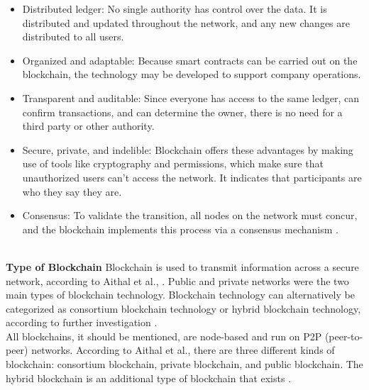 \begin{itemize}
    \item Distributed ledger: No single authority has control over the data. It is distributed and updated throughout the network, and any new changes are distributed to all users.
    \item Organized and adaptable: Because smart contracts can be carried out on the blockchain, the technology may be developed to support company operations.
   \item Transparent and auditable: Since everyone has access to the same ledger, can confirm transactions, and can determine the owner, there is no need for a third party or other authority. 
    \item Secure, private, and indelible:
    Blockchain offers these advantages by making use of tools like cryptography and permissions, which make sure that unauthorized users can't access the network. It indicates that participants are who they say they are.
    \item Consensus: To validate the transition, all nodes on the network must concur, and the blockchain implements this process via a consensus mechanism \cite{Gupta}.
\end{itemize}
\\
\textbf{Type of Blockchain}
Blockchain is used to transmit information across a secure network, according to Aithal et al., \cite{Aithal}. Public and private networks were the two main types of blockchain technology. Blockchain technology can alternatively be categorized as consortium blockchain technology or hybrid blockchain technology, according to further investigation \cite{Aithal}. \\
All blockchains, it should be mentioned, are node-based and run on P2P (peer-to-peer) networks. According to Aithal et al., \cite{Aithal}there are three different kinds of blockchain: consortium blockchain, private blockchain, and public blockchain. The hybrid blockchain is an additional type of blockchain that exists \cite{Aithal}.
